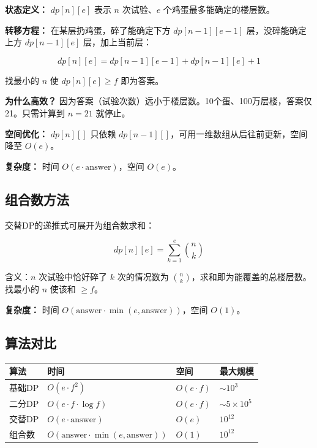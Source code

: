 \documentclass[12pt,a4paper]{article}
\begin{document}
\textbf{状态定义：} $dp[n][e]$ 表示 $n$ 次试验、$e$ 个鸡蛋最多能确定的楼层数。

\textbf{转移方程：} 在某层扔鸡蛋，碎了能确定下方 $dp[n-1][e-1]$ 层，没碎能确定上方 $dp[n-1][e]$ 层，加上当前层：

\begin{equation}
dp[n][e] = dp[n-1][e-1] + dp[n-1][e] + 1
\end{equation}

找最小的 $n$ 使 $dp[n][e] \geq f$ 即为答案。

\textbf{为什么高效？} 因为答案（试验次数）远小于楼层数。10个蛋、100万层楼，答案仅21。只需计算到 $n=21$ 就停止。

\textbf{空间优化：} $dp[n][]$ 只依赖 $dp[n-1][]$，可用一维数组从后往前更新，空间降至 $O(e)$。

\textbf{复杂度：} 时间 $O(e \cdot \text{answer})$，空间 $O(e)$。

\subsection{组合数方法}

交替DP的递推式可展开为组合数求和：

\begin{equation}
dp[n][e] = \sum_{k=1}^{e} \binom{n}{k}
\end{equation}

含义：$n$ 次试验中恰好碎了 $k$ 次的情况数为 $\binom{n}{k}$，求和即为能覆盖的总楼层数。找最小的 $n$ 使该和 $\geq f$。

\textbf{复杂度：} 时间 $O(\text{answer} \cdot \min(e, \text{answer}))$，空间 $O(1)$。

\subsection{算法对比}

\begin{table}[H]
\centering
\begin{tabular}{@{}llll@{}}
\toprule
\textbf{算法} & \textbf{时间} & \textbf{空间} & \textbf{最大规模} \\
\midrule
基础DP & $O(e \cdot f^2)$ & $O(e \cdot f)$ & $\sim 10^3$ \\
二分DP & $O(e \cdot f \cdot \log f)$ & $O(e \cdot f)$ & $\sim 5 \times 10^5$ \\
交替DP & $O(e \cdot \text{answer})$ & $O(e)$ & $10^{12}$ \\
组合数 & $O(\text{answer} \cdot \min(e,\text{answer}))$ & $O(1)$ & $10^{12}$ \\
\bottomrule
\end{tabular}
\end{table}
\end{document}
